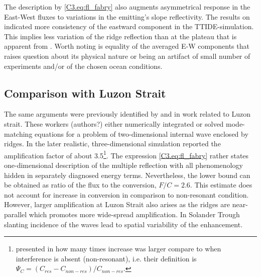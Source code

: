 \documentclass[12pt]{article}
\begin{document}
The description by \eqref{C3.eq:fl_fabry} also augments asymmetrical response in the 
East-West fluxes to variations in the emitting's slope reflectivity. The results on 
 indicated more 
consistency of the eastward component in the TTIDE-simulation. This implies less variation of the 
ridge reflection than at the plateau that is apparent from . Worth noting 
is equality of the averaged E-W components that raises question about its physical nature or 
being an artifact of small number of experiments and/or of the chosen ocean conditions.\\

\subsection{Comparison with Luzon Strait}
\label{C3.sec:disc_luzon}
The same arguments were previously identified by \cite{buijsman2012double} and 
\cite{klymak2013parameterizing} in work related to Luzon strait. These workers (authors?) either numerically integrated or solved mode-matching equations for a problem of two-dimensional internal wave enclosed by ridges. In the later  realistic, three-dimensional simulation \citep{buijsman2014three} reported the amplification factor of about 
3.5\footnote{\citep{buijsman2014three} presented in how many times increase was larger compare to 
when interference is absent (non-resonant), i.e. their definition is 
$\Psi_C = (C_{res} - C_{non-res})/C_{non-res}$.}. The expression 
\eqref{C3.eq:fl_fabry} rather states one-dimensional description of the multiple reflection 
with all phenomenology hidden in separately diagnosed energy terms. Nevertheless, the lower bound can be obtained as ratio of the flux to the conversion, $F/C = 2.6$. This estimate does not account for increase in conversion in comparison to non-resonant condition. However, larger amplification at Luzon Strait also arises as the ridges are near-parallel which promotes more wide-spread amplification. In Solander Trough slanting incidence of the waves  lead to spatial variability of the enhancement.\\
\end{document}
